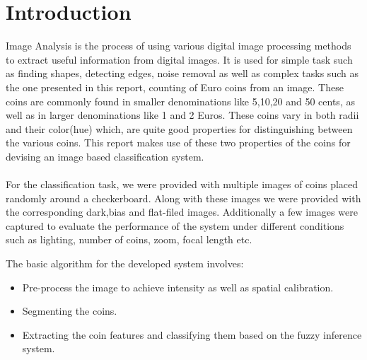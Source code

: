 \documentclass[report.tex]{subfile}
\begin{document}
\section{Introduction}

Image Analysis is the process of using various digital image processing methods to extract useful information from digital images. It is used for simple task such as finding shapes, detecting edges, noise removal as well as complex tasks such as the one presented in this report, counting of Euro coins from an image. These coins are commonly found in smaller denominations like 5,10,20 and 50 cents, as well as in larger denominations like 1 and 2 Euros. These coins vary in both radii and their color(hue) which, are quite good properties for distinguishing between the various coins. This report makes use of these two properties of the coins for devising an image based classification system. \\
\\

For the classification task, we were provided with multiple images of coins placed randomly around a checkerboard. Along with these images we were provided with the corresponding dark,bias and flat-filed images. Additionally a few images were captured to evaluate the performance of the system under different conditions such as lighting, number of coins, zoom, focal length etc. 

The basic algorithm for the developed system involves:
\begin{itemize}
  \item Pre-process the image to achieve intensity as well as spatial calibration. 
  \item Segmenting the coins. 
  \item Extracting the coin features and classifying them based on the fuzzy inference system.
\end{itemize}
\end{document}
